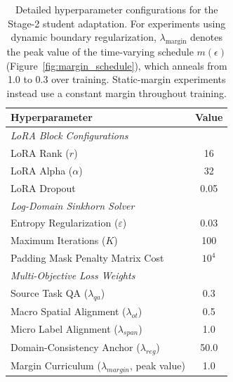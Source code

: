 \documentclass[11pt]{article}
\begin{document}
\begin{table}[t]
\centering
\small
\begin{tabular}{lc}
\toprule
\textbf{Hyperparameter} & \textbf{Value} \\
\midrule
\multicolumn{2}{l}{\textit{LoRA Block Configurations}} \\
LoRA Rank ($r$) & 16 \\
LoRA Alpha ($\alpha$) & 32 \\
LoRA Dropout & 0.05 \\
\midrule
\multicolumn{2}{l}{\textit{Log-Domain Sinkhorn Solver}} \\
Entropy Regularization ($\varepsilon$) & 0.03 \\
Maximum Iterations ($K$) & 100 \\
Padding Mask Penalty Matrix Cost & $10^4$ \\
\midrule
\multicolumn{2}{l}{\textit{Multi-Objective Loss Weights}} \\
Source Task QA ($\lambda_{qa}$) & 0.3 \\
Macro Spatial Alignment ($\lambda_{ot}$) & 0.5 \\
Micro Label Alignment ($\lambda_{span}$) & 1.0 \\
Domain-Consistency Anchor ($\lambda_{reg}$) & 50.0 \\
Margin Curriculum ($\lambda_{margin}$, peak value) & 1.0 \\
\bottomrule
\end{tabular}
\caption{Detailed hyperparameter configurations for the Stage-2 student adaptation. For experiments using dynamic boundary regularization,
$\lambda_{\text{margin}}$ denotes the peak value of the time-varying schedule
$m(\epsilon)$ (Figure~\ref{fig:margin_schedule}), which anneals from 1.0 to
0.3 over training. Static-margin experiments instead use a constant margin
throughout training.}
\label{tab:hyperparameters}
\end{table}
\end{document}
